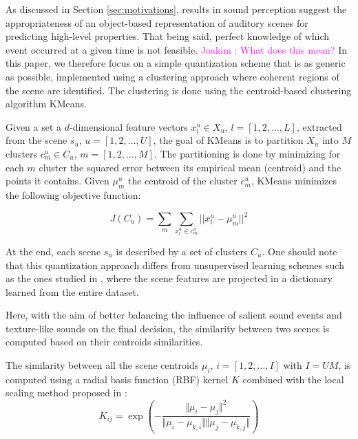 \documentclass[journal]{IEEEtran}
\newcommand{\ja}[1]{\textcolor{magenta}{Joakim : #1}}
\begin{document}
As discussed in Section \ref{sec:motivations}, results in sound perception suggest the appropriateness of an object-based representation of auditory scenes for predicting high-level properties. That being said, perfect knowledge of which event occurred at a given time is not feasible. \ja{What does this mean?} In this paper, we therefore focus on a simple quantization scheme that is as generic as possible, implemented using a clustering approach where coherent regions of the scene are identified. The clustering is done using the centroid-based clustering algorithm KMeans.

Given a set a $d$-dimensional feature vectors $x_l^u\in X_u$, $l=[1,2,\ldots,L]$, extracted from the scene $s_u$, $u=[1,2,\ldots,U]$, the goal of KMeans is to partition $X_u$ into $M$ clusters $c^u_m\in C_u$, $m=[1,2,\ldots,M]$. The partitioning is done by minimizing for each $m$ cluster the squared error between its empirical mean (centroid) and the points it contains. Given $\mu_m^u$ the centroid of the cluster $c_m^u$, KMeans minimizes the following objective function:

\begin{equation}
J(C_u)=\sum\limits_{m} \sum_{x^u_l\in c^u_m} \vert \vert x_l^u - \mu_m^u \vert \vert^2
\end{equation}

At the end, each scene $s_u$ is described by a set of clusters $C_u$. One should note that this quantization approach differs from unsupervised learning schemes such as the ones studied in \cite{bisot2016acoustic}, where the scene features are projected in a dictionary learned from the entire dataset.


Here, with the aim of better balancing the influence of salient sound events and texture-like sounds on the final decision, the similarity between two scenes is computed based on their centroids similarities.

The similarity between all the scene centroids $\mu_i$, $i=[1,2,\ldots,I]$ with $I=UM$, is computed using a radial basis function (RBF) kernel $K$ combined with the local scaling method proposed in \cite{selfTuneManor2004}:
\begin{equation}
\label{eq:kc}
K_{ij} = \exp\left( - \dfrac{\Vert \mu_i - \mu_j \Vert^2}{\Vert \mu_i - \mu_{k,i} \Vert \Vert \mu_j - \mu_{k,j} \Vert} \right) 
\end{equation} 
\end{document}
